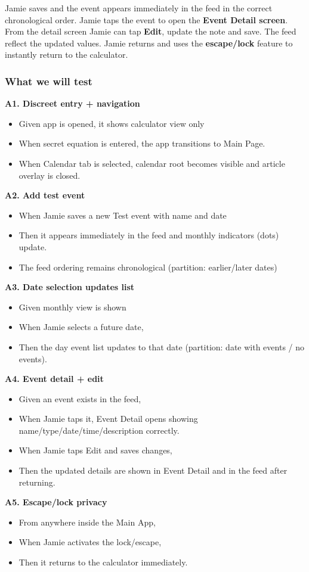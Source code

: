 \documentclass[a4paper,12pt]{article}
\begin{document}
Jamie saves and the event appears immediately in the feed in the correct chronological order.
Jamie taps the event to open the \textbf{Event Detail screen}. From the detail screen Jamie can tap \textbf{Edit}, update the note and save. The feed reflect the updated values. Jamie returns and uses the \textbf{escape/lock} feature to instantly return to the calculator.


\subsubsection{What we will test}
\textbf{A1. Discreet entry + navigation}
\begin{itemize}
    \item Given app is opened, it shows calculator view only
    \item When secret equation is entered, the app transitions to Main Page.
    \item When Calendar tab is selected, calendar root becomes visible and article overlay is closed.
\end{itemize}
\textbf{A2. Add test event}
\begin{itemize}
    \item When Jamie saves a new Test event with name and date
    \item Then it appears immediately in the feed and monthly indicators (dots) update.
    \item The feed ordering remains chronological (partition: earlier/later dates)
\end{itemize}
\textbf{A3. Date selection updates list}
\begin{itemize}
    \item Given monthly view is shown
    \item When Jamie selects a future date,
    \item Then the day event list updates to that date (partition: date with events / no events).
\end{itemize}
\textbf{A4. Event detail + edit}
\begin{itemize}
    \item Given an event exists in the feed,
    \item When Jamie taps it, Event Detail opens showing name/type/date/time/description correctly.
    \item When Jamie taps Edit and saves changes,
    \item Then the updated details are shown in Event Detail and in the feed after returning.
\end{itemize}
\textbf{A5. Escape/lock privacy}
\begin{itemize}
    \item From anywhere inside the Main App,
    \item When Jamie activates the lock/escape,
    \item Then it returns to the calculator immediately.
\end{itemize}
\end{document}
